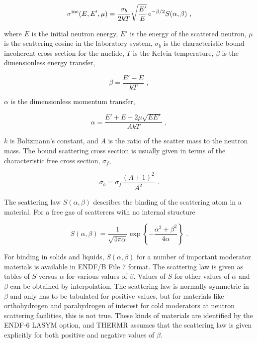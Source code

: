\begin{equation}
   \sigma^{\rm inc}(E,E',\mu)=\frac{\sigma_b}{2kT}
    \sqrt{\frac{E'}{E}}\,{\rm e}^{-\beta/2}S(\alpha,\beta)\,\,,
\label{incoh}
\end{equation}

\noindent
where $E$ is the initial neutron energy, $E'$ is the energy of the
scattered neutron, $\mu$ is the scattering cosine in the laboratory
system, $\sigma_b$ is the characteristic bound incoherent cross
section for the nuclide, $T$ is the Kelvin temperature, $\beta$ is the
dimensionless energy transfer,

\begin{equation}
   \beta=\frac{E'-E}{kT}\,\,,
\label{ebeta}
\end{equation}

\noindent
$\alpha$ is the dimensionless momentum transfer,

\begin{equation}
   \alpha=\frac{E'+E-2\mu\sqrt{EE'}}{AkT}\,\,,
\end{equation}

\noindent
$k$ is Boltzmann's constant, and $A$
is the ratio of the scatter mass to the neutron mass.  The
bound scattering cross section
is usually given in terms of the characteristic free cross
section, $\sigma_f$,

\begin{equation}
   \sigma_b=\sigma_f\frac{(A+1)^2}{A^2}\,\,.
\end{equation}

\noindent
The scattering law
$S(\alpha,\beta)$ describes the binding of the
scattering atom in a material.  For a free gas
of scatterers with no internal structure

\begin{equation}
   S(\alpha,\beta)=\frac{1}{\sqrt{4\pi\alpha}}
    \exp\left\{-\frac{\alpha^2+\beta^2}{4\alpha}\right\}\,\,.
\label{free}
\end{equation}

\noindent
For binding in solids and liquids, $S(\alpha,\beta)$ for a number of
important moderator materials is available in ENDF/B File 7
 format.  The scattering law is given as tables of $S$
versus $\alpha$ for various values of $\beta$.  Values of
$S$ for other values of $\alpha$ and $\beta$ can be obtained by interpolation.
The scattering law is normally symmetric in $\beta$ and only has to be
tabulated for positive values, but for materials like orthohydrogen and
parahydrogen
of interest for cold moderators at neutron scattering facilities,
this is not true.  These kinds of materials are identified by the ENDF-6 LASYM
option, and THERMR assumes that the scattering law is given explicitly
for both positive and negative values of $\beta$.

